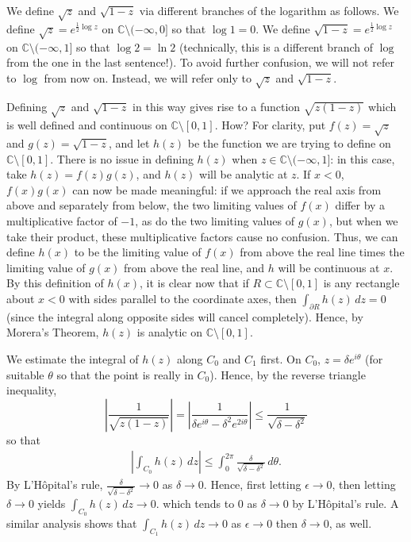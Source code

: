 \documentclass[11pt]{book}
\theoremstyle{definition}
\begin{document}
\begin{enumerate}
    We define $\sqrt z$ and $\sqrt{1-z}$ via different branches of the logarithm as follows.  We define $\sqrt z = e^{\tfrac 1 2 \log z}$ on $\mathbb C \setminus (-\infty, 0]$ so that $\log 1 = 0$.  We define $\sqrt{1-z} = e^{\tfrac 1 2 \log z}$ on $\mathbb C \setminus (-\infty, 1]$ so that $\log 2 = \ln 2$ (technically, this is a different branch of $\log$ from the one in the last sentence!).  To avoid further confusion, we will not refer to $\log$ from now on.  Instead, we will refer only to $\sqrt z$ and $\sqrt{1-z}$.  

    Defining $\sqrt z$ and $\sqrt{1-z}$ in this way gives rise to a function $\sqrt{z(1-z)}$ which is well defined and continuous on $\mathbb C \setminus [0,1]$.   How?  For clarity, put $f(z) = \sqrt z$ and $g(z) = \sqrt{1-z}$, and let $h(z)$ be the function we are trying to define on $\mathbb C \setminus [0,1]$.  There is no issue in defining $h(z)$ when $z \in \mathbb C \setminus (-\infty,1]$: in this case, take $h(z) = f(z)g(z)$, and $h(z)$ will be  analytic at $z$.   If $x < 0$,  $f(x)g(x)$ can now be made meaningful: if we approach the real axis from above and separately from below, the two limiting values of $f(x)$ differ by  a multiplicative factor of $-1$, as do the two limiting values of $g(x)$, but when we take their product, these multiplicative factors cause no confusion.  Thus, we can define $h(x)$ to be the limiting value of $f(x)$ from above the real line times the limiting value of $g(x)$ from above the real line, and $h$ will be continuous at $x$.   By this definition of $h(x)$, it is clear now that if $R \subset \mathbb C \setminus [0,1]$ is any rectangle about $x<0$ with sides parallel to the coordinate axes, then $\int_{\partial R} h(z) \, dz = 0$ (since the integral along opposite sides will cancel completely).  Hence, by Morera's Theorem,  $h(z)$ is analytic on $\mathbb C \setminus [0,1]$.  

    We estimate the integral of $h(z)$ along $C_0$ and $C_1$ first.  On $C_0$, $z=\delta e^{i\theta}$ (for suitable $\theta$ so that the point is really in $C_0$).  Hence,  by the reverse triangle inequality, 
    \[ \left| \frac{1}{\sqrt{z(1-z)}} \right| = \left| \frac{1}{\delta e^{i\theta} - \delta^2 e^{2i\theta}} \right| \leq \frac{1}{\sqrt{\delta - \delta^2}}   \] so that
        \begin{align*}
          \left| \int_{C_0} h(z) \, dz \right| \leq \int_0^{2\pi} \frac{\delta}{\sqrt{\delta-\delta^2}} \, d\theta.
        \end{align*}
        By L'H\^opital's rule, $\frac{\delta}{\sqrt{\delta-\delta^2}} \to 0$ as $\delta \to 0$.  Hence, first letting $\epsilon \to 0$, then letting $\delta\to 0$ yields $ \int_{C_0} h(z) \, dz  \to 0$.  which tends to $0$ as $\delta\to 0$ by L'H\^opital's rule.  A similar analysis   shows that $ \int_{C_1} h(z) \, dz  \to 0$ as $\epsilon\to 0$ then $\delta \to 0$, as well.   


\end{enumerate}
\end{document}
